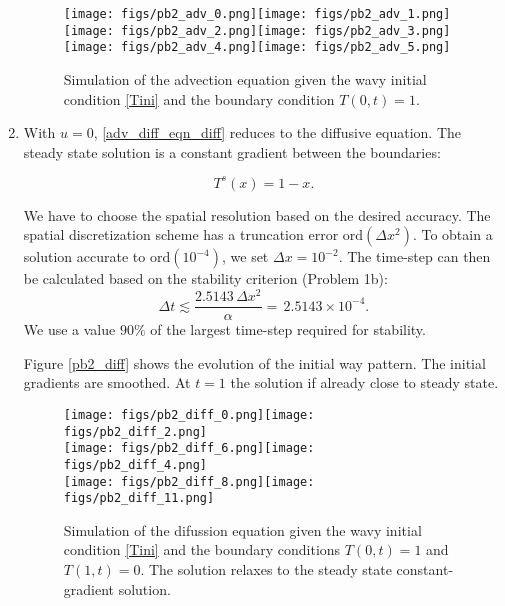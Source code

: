 \documentclass[11pt]{article}
\newcommand{\ord}{\mbox{ord}}
\def\beq{\begin{equation}}
\def\eeq{\end{equation}}
\begin{document}
\begin{enumerate}[label=(\alph*)]
\begin{figure}[p]
\begin{center}
    \texttt{[image: figs/pb2\_adv\_0.png]}\texttt{[image: figs/pb2\_adv\_1.png]} \\
    \texttt{[image: figs/pb2\_adv\_2.png]}\texttt{[image: figs/pb2\_adv\_3.png]} \\
     \texttt{[image: figs/pb2\_adv\_4.png]}\texttt{[image: figs/pb2\_adv\_5.png]}    
\end{center}    
\caption{Simulation of the advection equation given the wavy initial condition \eqref{Tini} and the boundary condition $T(0,t) = 1$.}
\label{pb2_adv}
\end{figure}

    \item With $u = 0$, \eqref{adv_diff_eqn_diff} reduces to the diffusive equation. The steady state solution is a constant gradient between the boundaries:

        \beq
            T^s(x) = 1 - x.
        \eeq

        We have to choose the spatial resolution based on the desired accuracy. The spatial discretization scheme has a truncation error $\ord{(\Delta x^2)}$. To obtain a solution accurate to $\ord{(10^{-4})}$, we set $\Delta x = 10^{-2}$. The time-step can then be calculated based on the stability criterion (Problem 1b):
        \beq
        \Delta t \lesssim \frac{2.5143\, \Delta x^2}{\alpha} =  \,2.5143 \times 10^{-4} .
        \eeq    
        We use a value $90 \%$ of the largest time-step required for stability.
            
    Figure \eqref{pb2_diff} shows the evolution of the initial way pattern. The initial gradients are smoothed. At $t=1$ the solution if already close to steady state.


\begin{figure}[p]
\begin{center}
    \texttt{[image: figs/pb2\_diff\_0.png]}\texttt{[image: figs/pb2\_diff\_2.png]} \\
    \texttt{[image: figs/pb2\_diff\_6.png]}\texttt{[image: figs/pb2\_diff\_4.png]} \\
     \texttt{[image: figs/pb2\_diff\_8.png]}\texttt{[image: figs/pb2\_diff\_11.png]}    
\end{center}    
\caption{Simulation of the difussion equation given the wavy initial condition \eqref{Tini} and the boundary conditions $T(0,t) = 1$  and  $T(1,t) = 0$. The solution relaxes to the steady state constant-gradient solution.}
\label{pb2_diff}
\end{figure}

\end{enumerate}
\end{document}
